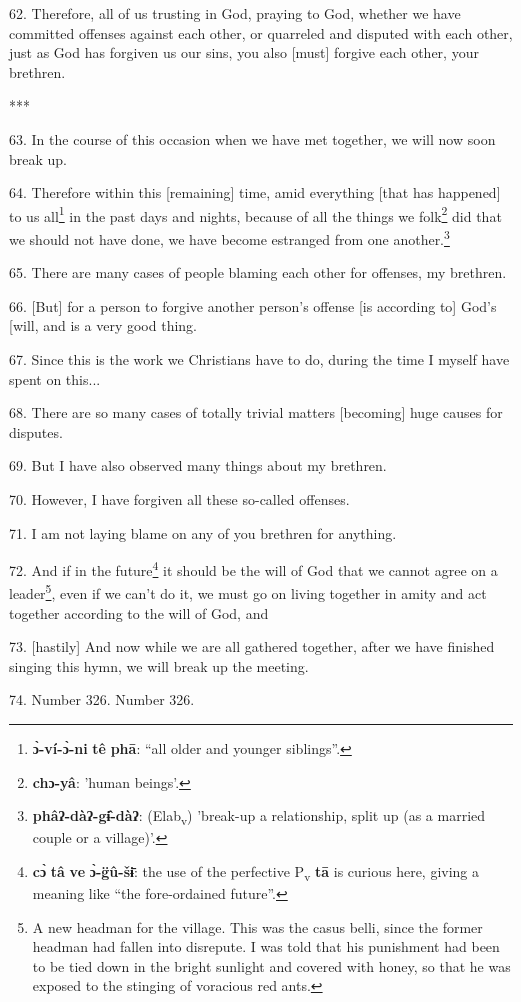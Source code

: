 62. Therefore, all of us trusting in God, praying to God, whether we have committed
offenses against each other, or quarreled and disputed with each other, just as
God has forgiven us our sins, you also [must] forgive each other, your brethren.

***

63. In the course of this occasion when we have met together, we will now soon
break up.

64. Therefore within this [remaining] time, amid everything [that has happened]
to us all\footnote{\textbf{ɔ̀-ví-ɔ̀-ni} \textbf{tê} \textbf{phā}: ``all older and younger siblings''.} in the past days and nights, because of all the things we folk\footnote{\textbf{chɔ-yâ}: 'human beings'.}
did that we should not have done, we have become estranged from one another.\footnote{\textbf{phâʔ-dàʔ-gɨ̂-dàʔ}: (Elab\textsubscript{v}) 'break-up a relationship, split up (as a married couple or a village)'.}

65. There are many cases of people blaming each other for offenses, my brethren.

66. [But] for a person to forgive another person's offense [is according to] God's
[will, and is a very good thing.

67. Since this is the work we Christians have to do, during the time I myself have
spent on this...

68. There are so many cases of totally trivial matters [becoming] huge causes for
disputes.

69. But I have also observed many things about my brethren.

70. However, I have forgiven all these so-called offenses.

71. I am not laying blame on any of you brethren for anything.

72. And if in the future\footnote{\textbf{cɔ̀} \textbf{tâ} \textbf{ve} \textbf{ɔ̀-g̈û-šɨ̄}: the use of the perfective P\textsubscript{v} \textbf{tā} is curious here, giving a meaning like ``the fore-ordained future''.} it should be the will of God that we cannot agree on
a leader\footnote{A new headman for the village. This was the casus belli, since the former headman had fallen into disrepute. I was told that his punishment had been to be tied down in the bright sunlight and covered with honey, so that he was exposed to the stinging of voracious red ants.}, even if we can't do it, we must go on living together in amity and
act together according to the will of God, and 

73. [hastily] And now while we are all gathered together, after we have finished
singing this hymn, we will break up the meeting.

74. Number 326. Number 326.


